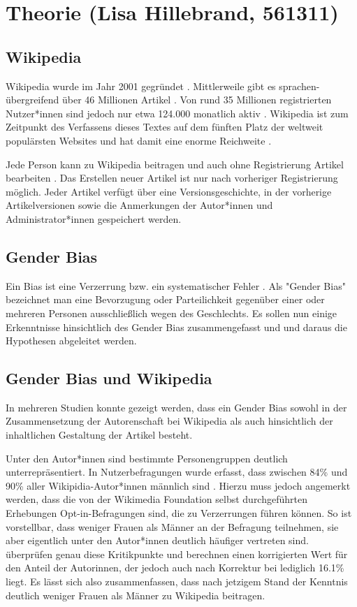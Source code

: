 \documentclass[11pt]{article}
\begin{document}
\section{Theorie (Lisa Hillebrand, 561311)}
\subsection{Wikipedia}
Wikipedia wurde im Jahr 2001 gegründet \parencite{wikipediaTimeline}. Mittlerweile gibt es sprachen- übergreifend über 46 Millionen Artikel \parencite{wikipedia_Size}. Von rund 35 Millionen registrierten Nutzer*innen sind jedoch nur etwa 124.000 monatlich aktiv \parencite{wikipedians}. Wikipedia ist zum Zeitpunkt des Verfassens dieses Textes auf dem fünften Platz der weltweit populärsten Websites und hat damit eine enorme Reichweite \parencite{Alexa2019}.

Jede Person kann zu Wikipedia beitragen und auch ohne Registrierung Artikel bearbeiten \parencite{wikipediaTutorial}. Das Erstellen neuer Artikel ist nur nach vorheriger Registrierung möglich. Jeder Artikel verfügt über eine Versionsgeschichte, in der vorherige Artikelversionen sowie die Anmerkungen der Autor*innen und Administrator*innen gespeichert werden.

\subsection{Gender Bias}

Ein Bias ist eine Verzerrung bzw. ein systematischer Fehler \parencite{Wirtz}. Als "Gender Bias" bezeichnet man eine Bevorzugung oder Parteilichkeit gegenüber einer oder mehreren Personen ausschließlich wegen des Geschlechts. Es sollen nun einige Erkenntnisse hinsichtlich des Gender Bias zusammengefasst und und daraus die Hypothesen abgeleitet werden.

\subsection{Gender Bias und Wikipedia}
In mehreren Studien konnte gezeigt werden, dass ein Gender Bias sowohl in der Zusammensetzung der Autorenschaft bei Wikipedia als auch hinsichtlich der inhaltlichen Gestaltung der Artikel besteht.

Unter den Autor*innen sind bestimmte Personengruppen deutlich unterrepräsentiert. In Nutzerbefragungen wurde erfasst, dass zwischen 84\% und 90\% aller Wikipidia-Autor*innen männlich sind \parencite{wikimediaReport,GraellsGarrido2015}. Hierzu muss jedoch angemerkt werden, dass die von der Wikimedia Foundation selbst durchgeführten Erhebungen Opt-in-Befragungen sind, die zu Verzerrungen führen können. So ist vorstellbar, dass weniger Frauen als Männer an der Befragung teilnehmen, sie aber eigentlich unter den Autor*innen deutlich häufiger vertreten sind. \textcite{Hill2013} überprüfen genau diese Kritikpunkte und berechnen einen korrigierten Wert für den Anteil der Autorinnen, der jedoch auch nach Korrektur bei lediglich 16.1\% liegt. Es lässt sich also zusammenfassen, dass nach jetzigem Stand der Kenntnis deutlich weniger Frauen als Männer zu Wikipedia beitragen.
\end{document}
